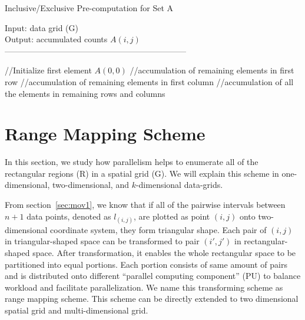 \documentclass[AMA,LATO1COL]{WileyNJD-v2}
\begin{document}
\begin{algorithm}[t!]
\caption{Inclusive/Exclusive Pre-computation for Set A}\label{preinex}
Input: data grid (G) \\
Output: accumulated counts $A(i,j)$\\
------------------------------------------------------------------ \\
\begin{algorithmic}[1]
\State //Initialize first element $A(0,0)$
\State //accumulation of remaining elements in first row
\EndFor
\State //accumulation of remaining elements in first column
\EndFor
\State //accumulation of all the elements in remaining rows and columns
\EndFor
{}
\EndFor
\EndFor
\end{algorithmic}
\end{algorithm}


\section {Range Mapping Scheme} \label{RMS}
In this section, we study how parallelism helps to enumerate all of the rectangular regions (R) in a spatial grid (G). We will explain this scheme in one-dimensional, two-dimensional, and $k$-dimensional data-grids.

From section~\ref{sec:mov1}, we know that if all of the pairwise intervals between $n+1$ data points, denoted as $l_{(i,j)}$, are plotted as point $(i,j)$ onto two-dimensional coordinate system, they form triangular shape. Each pair of $(i,j)$ in triangular-shaped space can be transformed to pair $(i',j')$ in rectangular-shaped space. After transformation, it enables the whole rectangular space to be partitioned into equal portions. Each portion consists of same amount of pairs and is distributed onto different ``parallel computing component'' (PU) to balance workload and facilitate parallelization. We name this transforming scheme as range mapping scheme. This scheme can be directly extended to two dimensional spatial grid and multi-dimensional grid.
\end{document}
